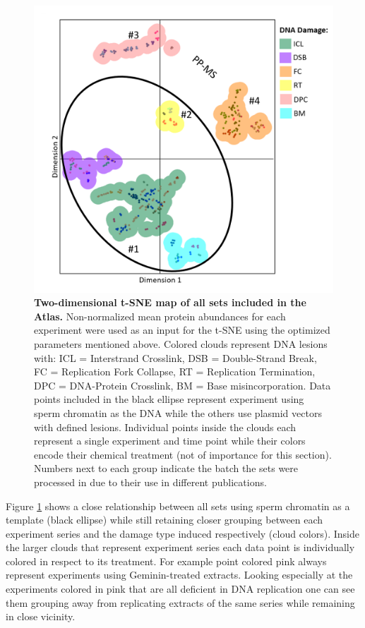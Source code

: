 \begin{figure}[H]
    \centering
    \includegraphics[width=.6\textwidth]{resources/images/Results/tSNE_map.png}
    \caption[Two-dimensional t-SNE map of all sets included in the Atlas]{\textbf{Two-dimensional t-SNE map of all sets included in the Atlas. }Non-normalized mean protein abundances for each experiment were used as an input for the t-SNE using the optimized parameters mentioned above. Colored clouds represent DNA lesions with: ICL = Interstrand Crosslink, DSB = Double-Strand Break, FC = Replication Fork Collapse, RT = Replication Termination, DPC = DNA-Protein Crosslink, BM = Base misincorporation. Data points included in the black ellipse represent experiment using sperm chromatin as the DNA while the others use plasmid vectors with defined lesions. Individual points inside the clouds each represent a single experiment and time point while their colors encode their chemical treatment (not of importance for this section). Numbers next to each group indicate the batch the sets were processed in due to their use in different publications.}
    \label{fig:tsnemap}
\end{figure}
Figure \ref{fig:tsnemap} shows a close relationship between all sets using sperm chromatin as a template (black ellipse) while still retaining closer grouping between each experiment series and the damage type induced respectively (cloud colors). Inside the larger clouds that represent experiment series each data point is individually colored in respect to its treatment. For example point colored pink always represent experiments using Geminin-treated extracts. Looking especially at the experiments colored in pink that are all deficient in DNA replication one can see them grouping away from replicating extracts of the same series while remaining in close vicinity.\\
